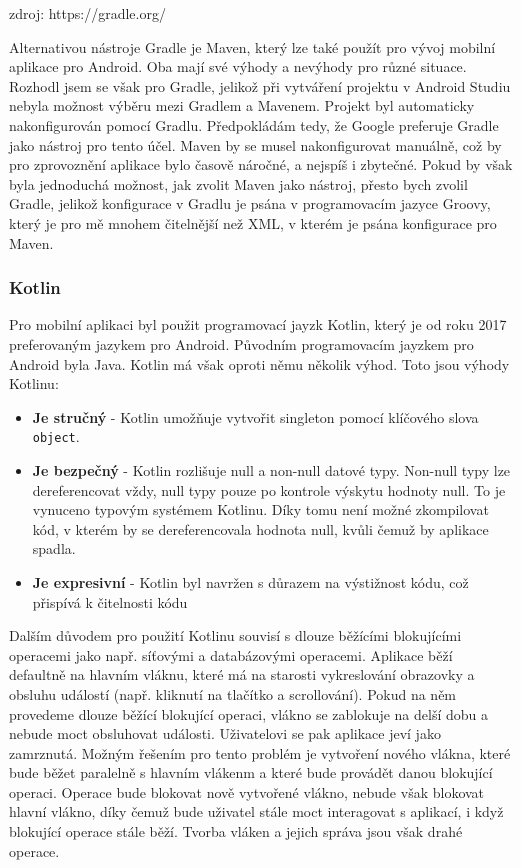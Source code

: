 zdroj: https://gradle.org/

\noindent Alternativou nástroje Gradle je Maven, který lze také použít pro vývoj mobilní aplikace pro Android. Oba mají své výhody a nevýhody pro různé situace. Rozhodl jsem se však pro Gradle, jelikož při vytváření projektu v Android Studiu nebyla možnost výběru mezi Gradlem a Mavenem. Projekt byl automaticky nakonfigurován pomocí Gradlu. Předpokládám tedy, že Google preferuje Gradle jako nástroj pro tento účel. Maven by se musel nakonfigurovat manuálně, což by pro zprovoznění aplikace bylo časově náročné, a nejspíš i zbytečné. Pokud by však byla jednoduchá možnost, jak zvolit Maven jako nástroj, přesto bych zvolil Gradle, jelikož konfigurace v Gradlu je psána v programovacím jazyce Groovy, který je pro mě mnohem čitelnější než XML, v kterém je psána konfigurace pro Maven.

\subsubsection *{Kotlin}
Pro mobilní aplikaci byl použit programovací jayzk Kotlin, který je od roku 2017 preferovaným jazykem pro Android. Původním programovacím jayzkem pro Android byla Java.	 Kotlin má však oproti němu několik výhod. Toto jsou výhody Kotlinu:

\begin{itemize}
    \item \textbf{Je stručný} - Kotlin umožňuje vytvořit 
    singleton pomocí klíčového slova \lstinline{object}.
    
    \item \textbf{Je bezpečný} - Kotlin rozlišuje null a non-null datové typy. Non-null typy lze dereferencovat vždy, null typy pouze po kontrole výskytu hodnoty null. To je vynuceno typovým systémem Kotlinu. Díky tomu není možné zkompilovat kód, v kterém by se dereferencovala hodnota null, kvůli čemuž by aplikace spadla.
    
    \item \textbf{Je expresivní} - Kotlin byl navržen s důrazem na výstižnost kódu, což přispívá k čitelnosti kódu
\end{itemize}

\noindent Dalším důvodem pro použití Kotlinu souvisí s dlouze běžícími blokujícími operacemi jako např. síťovými a databázovými operacemi. Aplikace běží defaultně na hlavním vláknu, které má na starosti vykreslování obrazovky a obsluhu událostí (např. kliknutí na tlačítko a scrollování). Pokud na něm provedeme dlouze běžící blokující operaci, vlákno se zablokuje na delší dobu a nebude moct obsluhovat události. Uživatelovi se pak aplikace jeví jako zamrznutá. Možným řešením pro tento problém je vytvoření nového vlákna, které bude běžet paralelně s hlavním vlákenm a které bude provádět danou blokující operaci. Operace bude blokovat nově vytvořené vlákno, nebude však blokovat hlavní vlákno, díky čemuž bude uživatel stále moct interagovat s aplikací, i když blokující operace stále běží. Tvorba vláken a jejich správa jsou však drahé operace. 

